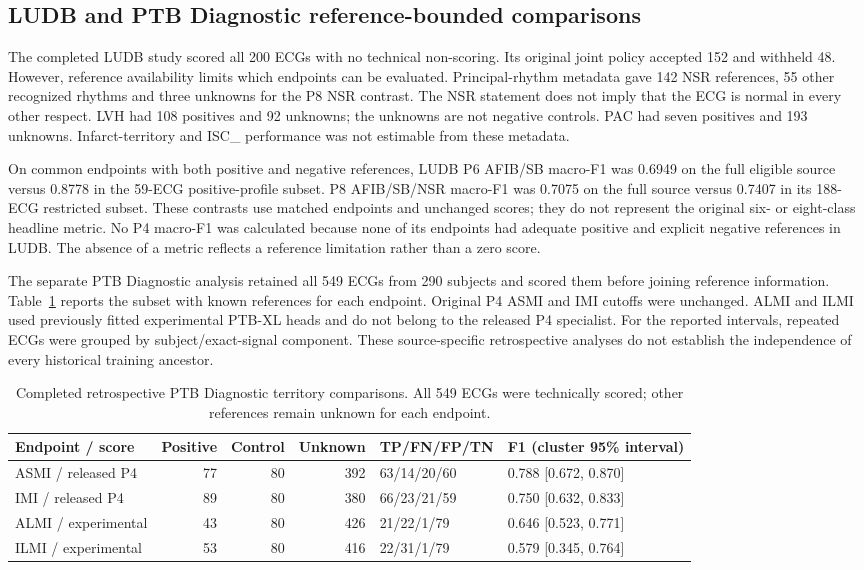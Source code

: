 \subsection{LUDB and PTB Diagnostic reference-bounded comparisons}
\label{sec:ludb-ptb}
The completed LUDB study scored all 200 ECGs with no technical non-scoring. Its original joint policy accepted 152 and withheld 48. However, reference availability limits which endpoints can be evaluated. Principal-rhythm metadata gave 142 NSR references, 55 other recognized rhythms and three unknowns for the P8 NSR contrast. The NSR statement does not imply that the ECG is normal in every other respect. LVH had 108 positives and 92 unknowns; the unknowns are not negative controls. PAC had seven positives and 193 unknowns. Infarct-territory and ISC\_ performance was not estimable from these metadata.

On common endpoints with both positive and negative references, LUDB P6 AFIB/SB macro-F1 was 0.6949 on the full eligible source versus 0.8778 in the 59-ECG positive-profile subset. P8 AFIB/SB/NSR macro-F1 was 0.7075 on the full source versus 0.7407 in its 188-ECG restricted subset. These contrasts use matched endpoints and unchanged scores; they do not represent the original six- or eight-class headline metric. No P4 macro-F1 was calculated because none of its endpoints had adequate positive and explicit negative references in LUDB. The absence of a metric reflects a reference limitation rather than a zero score.

The separate PTB Diagnostic analysis retained all 549 ECGs from 290 subjects and scored them before joining reference information. Table~\ref{tab:ptb-transport} reports the subset with known references for each endpoint. Original P4 ASMI and IMI cutoffs were unchanged. ALMI and ILMI used previously fitted experimental PTB-XL heads and do not belong to the released P4 specialist. For the reported intervals, repeated ECGs were grouped by subject/exact-signal component. These source-specific retrospective analyses do not establish the independence of every historical training ancestor.

\begin{table}[tbp]
\caption{Completed retrospective PTB Diagnostic territory comparisons. All 549 ECGs were technically scored; other references remain unknown for each endpoint.\label{tab:ptb-transport}}
\centering\small
\begin{tabular}{@{}p{.20\linewidth}rrrp{.21\linewidth}p{.19\linewidth}@{}}
\toprule
Endpoint / score & Positive & Control & Unknown & TP/FN/FP/TN & F1 (cluster 95\% interval) \\
\midrule
ASMI / released P4 & 77 & 80 & 392 & 63/14/20/60 & 0.788 [0.672, 0.870] \\
IMI / released P4 & 89 & 80 & 380 & 66/23/21/59 & 0.750 [0.632, 0.833] \\
ALMI / experimental & 43 & 80 & 426 & 21/22/1/79 & 0.646 [0.523, 0.771] \\
ILMI / experimental & 53 & 80 & 416 & 22/31/1/79 & 0.579 [0.345, 0.764] \\
\bottomrule
\end{tabular}
\end{table}

